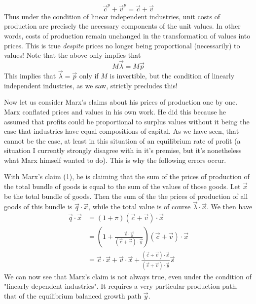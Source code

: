 \[ \vec{c}^p + \vec{v}^p = \vec{c}+\vec{v} \]
Thus under the condition of linear independent industries, unit costs of production are precisely the necessary components of the unit values. In other words, costs of production remain unchanged in the transformation of values into prices. This is true \emph{despite} prices no longer being proportional (necessarily) to values! Note that the above only implies that
\[ M\vec{\lambda} = M\vec{p} \]
This implies that $\vec{\lambda} = \vec{p}$ only if $M$ is invertible, but the condition of linearly independent industries, as we saw, strictly precludes this! \par 
Now let us consider Marx's claims about his prices of production one by one. Marx conflated prices and values in his own work. He did this because he assumed that profits could be proportional to surplus values without it being the case that industries have equal compositions of capital. As we have seen, that cannot be the case, at least in this situation of an equilibrium rate of profit (a situation I currently strongly disagree with in it's premise, but it's nonetheless what Marx himself wanted to do). This is why the following errors occur. \par  
With Marx's claim (1), he is claiming that the sum of the prices of production of the total bundle of goods is equal to the sum of the values of those goods. Let $\vec{x}$ be the total bundle of goods. Then the sum of the the prices of production of all goods of this bundle is $\vec{q}\cdot \vec{x}$, while the total value is of course $\vec{\lambda} \cdot \vec{x}$. We then have 
\begin{align*}
	\vec{q}\cdot\vec{x} &= (1+\pi)(\vec{c}+\vec{v})\cdot\vec{x} \\
		&= (1+\frac{\vec{s}\cdot\vec{y}}{(\vec{c}+\vec{v})\cdot\vec{y}})(\vec{c}+\vec{v})\cdot\vec{x} \\
		&= \vec{c}\cdot\vec{x} + \vec{v}\cdot\vec{x} + \frac{(\vec{c}+\vec{v})\cdot\vec{x}}{(\vec{c}+\vec{v})\cdot\vec{y}}\vec{s}
\end{align*} 
We can now see that Marx's claim is not always true, even under the condition of "linearly dependent industries". It requires a very particular production path, that of the equilibrium balanced growth path $\vec{y}$. 
